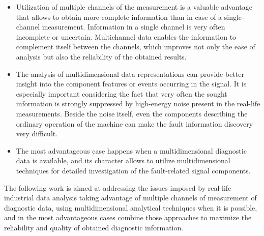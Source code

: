 \begin{itemize}
    \item Utilization of multiple channels of the measurement is a valuable advantage that allows to obtain more complete information than in case of a single-channel measurement. Information in a single channel is very often incomplete or uncertain. Multichannel data enables the information to complement itself between the channels, which improves not only the ease of analysis but also the reliability of the obtained results.
    \item The analysis of multidimensional data representations can provide better insight into the component features or events occurring in the signal. It is especially important considering the fact that very often the sought information is strongly suppressed by high-energy noise present in the real-life measurements. Beside the noise itself, even the components describing the ordinary operation of the machine can make the fault information discovery very difficult.
    \item The most advantageous case happens when a multidimensional diagnostic data is available, and its character allows to utilize multidimensional techniques for detailed investigation of the fault-related signal components.
\end{itemize}

The following work is aimed at addressing the issues imposed by real-life industrial data analysis taking advantage of multiple channels of measurement of diagnostic data, using multidimensional analytical techniques when it is possible, and in the most advantageous cases combine those approaches to maximize the reliability and quality of obtained diagnostic information.